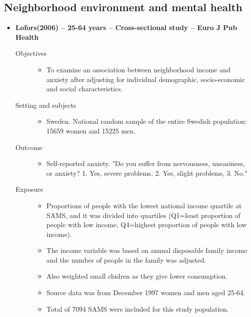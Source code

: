 \documentclass{article}
\begin{document}
\subsection{Neighborhood environment and mental health}
\begin{itemize}
	\item{\bf Lofors(2006) -- 25-64 years -- Cross-sectional study -- Euro J Pub Health} 
		\begin{description}
			\item[Objectives]\mbox{}\par
				\begin{itemize}
					\item To examine an association between neighborhood income and anxiety after adjusting for individual demographic, socio-economic and social characteristics.
				\end{itemize}
			\item[Setting and subjects] \mbox{}\par
				\begin{itemize}
					\item Sweden. National random sample of the entire Swedish population: 15659 women and 15225 men.
				\end{itemize}
			\item[Outcome]\mbox{}\par
				\begin{itemize}
					\item  Self-reported anxiety. "Do you suffer from nervousness, uneasiness, or anxiety? 1. Yes, severe problems, 2. Yes, slight problems, 3. No."
				\end{itemize}
			\item[Exposure] \mbox{}\par
				\begin{itemize}
					\item Proportions of people with the lowest national income quartile at SAMS, and it was divided into quartiles (Q1=least proportion of people with low income, Q4=highest proportion of people with low income). 
					\item The income variable was based on annual disposable family income and the number of people in the family was adjusted. 
					\item Also weighted small chidren as they give lower consumption. 
					\item Source data was from December 1997 women and men aged 25-64. 
					\item Total of 7094 SAMS were included for this study population. 

\end{itemize}
\end{description}
\end{itemize}
\end{document}
